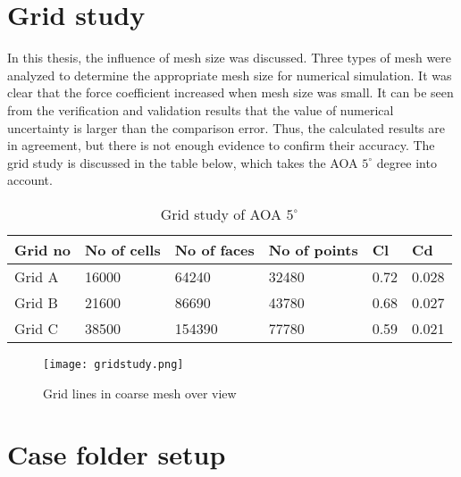 \section{Grid study}
In this thesis, the influence of mesh size was discussed. Three types of mesh were analyzed to 
determine the appropriate mesh size for numerical simulation. It was clear that the force coefficient increased when
mesh size was small. It can be seen from the verification and validation results that the value of numerical 
uncertainty is larger than the comparison error. Thus, the calculated results are in agreement, but there 
is not enough evidence to confirm their accuracy. The grid study is discussed in the table below, which takes the AOA $5^{\circ}$ degree into account. 
\begin{table}[h]
\centering
\begin{tabular}{|l|l|l|l|l|l|}
\hline
 \rowcolor{gray!20}Grid no& No of cells & No of faces &No of points  & Cl & Cd \\ \hline
Grid A & 16000 & 64240 & 32480  & 0.72 & 0.028 \\ \hline
 Grid B& 21600 & 86690 & 43780 & 0.68 & 0.027 \\ \hline
Grid C & 38500  & 154390 &77780  & 0.59 & 0.021 \\ \hline
\end{tabular}
\caption{Grid study of  AOA $5^{\circ}$}
\label{fig: fig16}
\end{table}
\begin{figure}[H]
    \centering
    \texttt{[image: gridstudy.png]}
    \caption{Grid lines in coarse mesh over view}
    \label{fig:fig17}
\end{figure}
\section{Case folder setup}
